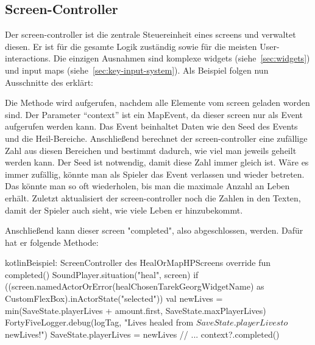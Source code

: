 \renewcommand{\kapitelautor}{Autor: Felix Zwickelstorfer}
\subsection{Screen-Controller}\label{subsec:screen-controller}
\renewcommand{\kapitelautor}{Autor: Felix Zwickelstorfer}

Der screen-controller ist die zentrale Steuereinheit eines screens und verwaltet diesen.
Er ist für die gesamte Logik zuständig sowie für die meisten User-interactions.
Die einzigen Ausnahmen sind komplexe widgets (siehe~\ref{sec:widgets}) und input maps (siehe~\ref{sec:key-input-system}).
Als Beispiel folgen nun Ausschnitte des  erklärt:



Die  Methode wird aufgerufen, nachdem alle Elemente vom screen geladen worden sind.
Der Parameter ``context'' ist ein MapEvent, da dieser screen nur als Event aufgerufen werden kann.
Das Event beinhaltet Daten wie den Seed des Events und die Heil-Bereiche.
Anschließend berechnet der screen-controller eine zufällige Zahl aus diesen Bereichen und bestimmt dadurch, wie viel man jeweils geheilt werden kann.
Der Seed ist notwendig, damit diese Zahl immer gleich ist.
Wäre es immer zufällig, könnte man als Spieler das Event verlassen und wieder betreten.
Das könnte man so oft wiederholen, bis man die maximale Anzahl an Leben erhält.
Zuletzt aktualisiert der screen-controller noch die Zahlen in den Texten, damit der Spieler auch sieht, wie viele Leben er hinzubekommt.

Anschließend kann dieser screen "completed", also abgeschlossen, werden.
Dafür hat er folgende Methode:
\begin{codeBlock}{kotlin}{Beispiel: Screen\-Controller des HealOrMapHP\-Screens}
    override fun completed() {
        SoundPlayer.situation("heal", screen)
        if ((screen.namedActorOrError(healChosenTarekGeorgWidgetName) as CustomFlexBox).inActorState("selected")) {
            val newLives = min(SaveState.playerLives + amount.first, SaveState.maxPlayerLives)
            FortyFiveLogger.debug(logTag, "Lives healed from ${SaveState.playerLives} to $newLives!")
            SaveState.playerLives = newLives
        }
        // ...
        context?.completed()
    }
\end{codeBlock}

